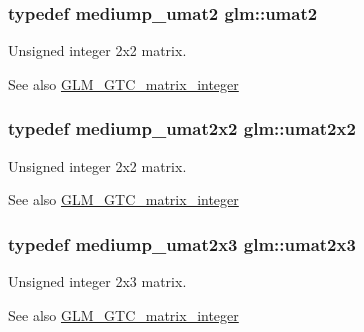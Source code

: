 \subsubsection[{umat2}]{\setlength{\rightskip}{0pt plus 5cm}typedef mediump\+\_\+umat2 {\bf glm\+::umat2}}\label{group__gtc__matrix__integer_gae2d45c058cfa0b60ab4df0cdda2d8516}
Unsigned integer 2x2 matrix. \begin{DoxySeeAlso}{See also}
\hyperlink{group__gtc__matrix__integer}{G\+L\+M\+\_\+\+G\+T\+C\+\_\+matrix\+\_\+integer} 
\end{DoxySeeAlso}
\hypertarget{group__gtc__matrix__integer_gad3c997b31dd69bdb4787867e758ed48d}{}
\subsubsection[{umat2x2}]{\setlength{\rightskip}{0pt plus 5cm}typedef mediump\+\_\+umat2x2 {\bf glm\+::umat2x2}}\label{group__gtc__matrix__integer_gad3c997b31dd69bdb4787867e758ed48d}
Unsigned integer 2x2 matrix. \begin{DoxySeeAlso}{See also}
\hyperlink{group__gtc__matrix__integer}{G\+L\+M\+\_\+\+G\+T\+C\+\_\+matrix\+\_\+integer} 
\end{DoxySeeAlso}
\hypertarget{group__gtc__matrix__integer_ga890ae28f9230794138b2c89f44ce3376}{}
\subsubsection[{umat2x3}]{\setlength{\rightskip}{0pt plus 5cm}typedef mediump\+\_\+umat2x3 {\bf glm\+::umat2x3}}\label{group__gtc__matrix__integer_ga890ae28f9230794138b2c89f44ce3376}
Unsigned integer 2x3 matrix. \begin{DoxySeeAlso}{See also}
\hyperlink{group__gtc__matrix__integer}{G\+L\+M\+\_\+\+G\+T\+C\+\_\+matrix\+\_\+integer} 
\end{DoxySeeAlso}
\hypertarget{group__gtc__matrix__integer_ga3b23b164240cf4dfb429776da7be9d88}{}
